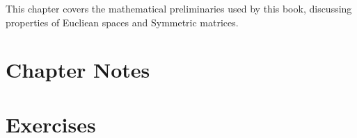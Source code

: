 
This chapter covers the mathematical preliminaries used by this book, discussing properties of Eucliean spaces and Symmetric matrices.



\section{Chapter Notes}




\section{Exercises}
